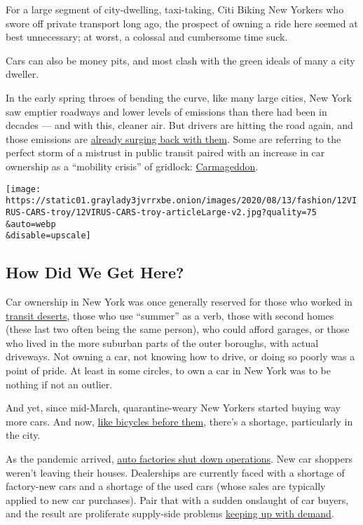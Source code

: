 For a large segment of city-dwelling, taxi-taking, Citi Biking New
Yorkers who swore off private transport long ago, the prospect of owning
a ride here seemed at best unnecessary; at worst, a colossal and
cumbersome time suck.

Cars can also be money pits, and most clash with the green ideals of
many a city dweller.

In the early spring throes of bending the curve, like many large cities,
New York saw emptier roadways and lower levels of emissions than there
had been in decades --- and with this, cleaner air. But drivers are
hitting the road again, and those emissions are
\href{https://www.nytimes3xbfgragh.onion/interactive/2020/06/17/climate/virus-emissions-reopening.html}{already
surging back with them}. Some are referring to the perfect storm of a
mistrust in public transit paired with an increase in car ownership as a
``mobility crisis'' of gridlock:
\href{https://nyc.streetsblog.org/2020/08/04/yet-another-report-yes-mr-mayor-carmageddon-is-coming/}{Carmageddon}.

\texttt{[image: https://static01.graylady3jvrrxbe.onion/images/2020/08/13/fashion/12VIRUS-CARS-troy/12VIRUS-CARS-troy-articleLarge-v2.jpg?quality=75\\\&auto=webp\\\&disable=upscale]}

\hypertarget{how-did-we-get-here}{%
\subsection{How Did We Get Here?}\label{how-did-we-get-here}}

Car ownership in New York was once generally reserved for those who
worked in
\href{https://www.nytimes3xbfgragh.onion/2019/10/11/realestate/whos-afraid-of-a-transit-desert.html}{transit
deserts}, those who use ``summer'' as a verb, those with second homes
(these last two often being the same person), who could afford garages,
or those who lived in the more suburban parts of the outer boroughs,
with actual driveways. Not owning a car, not knowing how to drive, or
doing so poorly was a point of pride. At least in some circles, to own a
car in New York was to be nothing if not an outlier.

And yet, since mid-March, quarantine-weary New Yorkers started buying
way more cars. And now,
\href{https://www.nytimes3xbfgragh.onion/2020/05/18/nyregion/bike-shortage-coronavirus.html}{like
bicycles before them}, there's a shortage, particularly in the city.

As the pandemic arrived,
\href{https://www.nytimes3xbfgragh.onion/2020/03/18/business/economy/gm-ford-fiatchrysler-factories-virus.html}{auto
factories shut down operations}. New car shoppers weren't leaving their
houses. Dealerships are currently faced with a shortage of factory-new
cars and a shortage of the used cars (whose sales are typically applied
to new car purchases). Pair that with a sudden onslaught of car buyers,
and the result are proliferate supply-side problems
\href{https://twitter.com/thestalwart/status/1291110174879514628?s=21}{keeping
up with demand}.

